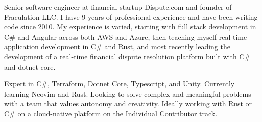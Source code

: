

\begin{cvparagraph}

Senior software engineer at financial startup Dispute.com and founder of Fraculation LLC.\@
I have 9 years of professional experience and have been writing code since 2010. My experience is varied, starting with 
full stack development in C\# and Angular across both AWS and Azure, then teaching myself real-time application development in C\# and Rust,
and most recently leading the development of a real-time financial dispute resolution platform built with C\# and dotnet core.

Expert in C\#, Terraform, Dotnet Core, Typescript, and Unity. Currently learning Neovim and Rust. 
Looking to solve complex and meaningful problems with a team that values autonomy and creativity.
Ideally working with Rust or C\# on a cloud-native platform on the Individual Contributor track.


\end{cvparagraph}
